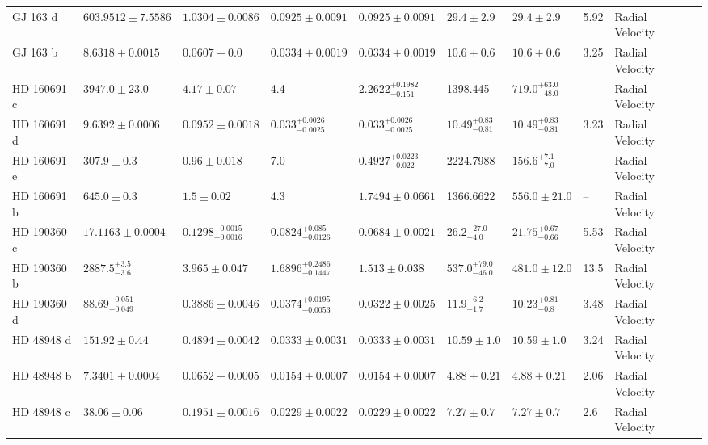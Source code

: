 \begin{tabular}{llllllllll}
GJ 163 d & $603.9512 \pm 7.5586$ & $1.0304 \pm 0.0086$ & $0.0925 \pm 0.0091$ & $0.0925 \pm 0.0091$ & $29.4 \pm 2.9$ & $29.4 \pm 2.9$ & 5.92 & Radial Velocity & \cite{BONFILS_ET_AL__2013} \\
GJ 163 b & $8.6318 \pm 0.0015$ & $0.0607 \pm 0.0$ & $0.0334 \pm 0.0019$ & $0.0334 \pm 0.0019$ & $10.6 \pm 0.6$ & $10.6 \pm 0.6$ & 3.25 & Radial Velocity & \cite{BONFILS_ET_AL__2013} \\
HD 160691 c & $3947.0 \pm 23.0$ & $4.17 \pm 0.07$ & 4.4 & $2.2622^{+0.1982}_{-0.151}$ & 1398.445 & $719.0^{+63.0}_{-48.0}$ & -- & Radial Velocity & \cite{BENEDICT_ET_AL__2022} \\
HD 160691 d & $9.6392 \pm 0.0006$ & $0.0952 \pm 0.0018$ & $0.033^{+0.0026}_{-0.0025}$ & $0.033^{+0.0026}_{-0.0025}$ & $10.49^{+0.83}_{-0.81}$ & $10.49^{+0.83}_{-0.81}$ & 3.23 & Radial Velocity & \cite{BENEDICT_ET_AL__2022} \\
HD 160691 e & $307.9 \pm 0.3$ & $0.96 \pm 0.018$ & 7.0 & $0.4927^{+0.0223}_{-0.022}$ & 2224.7988 & $156.6^{+7.1}_{-7.0}$ & -- & Radial Velocity & \cite{BENEDICT_ET_AL__2022} \\
HD 160691 b & $645.0 \pm 0.3$ & $1.5 \pm 0.02$ & 4.3 & $1.7494 \pm 0.0661$ & 1366.6622 & $556.0 \pm 21.0$ & -- & Radial Velocity & \cite{BENEDICT_ET_AL__2022} \\
HD 190360 c & $17.1163 \pm 0.0004$ & $0.1298^{+0.0015}_{-0.0016}$ & $0.0824^{+0.085}_{-0.0126}$ & $0.0684 \pm 0.0021$ & $26.2^{+27.0}_{-4.0}$ & $21.75^{+0.67}_{-0.66}$ & 5.53 & Radial Velocity & \cite{GIOVINAZZI_ET_AL_2026} \\
HD 190360 b & $2887.5^{+3.5}_{-3.6}$ & $3.965 \pm 0.047$ & $1.6896^{+0.2486}_{-0.1447}$ & $1.513 \pm 0.038$ & $537.0^{+79.0}_{-46.0}$ & $481.0 \pm 12.0$ & 13.5 & Radial Velocity & \cite{GIOVINAZZI_ET_AL_2026} \\
HD 190360 d & $88.69^{+0.051}_{-0.049}$ & $0.3886 \pm 0.0046$ & $0.0374^{+0.0195}_{-0.0053}$ & $0.0322 \pm 0.0025$ & $11.9^{+6.2}_{-1.7}$ & $10.23^{+0.81}_{-0.8}$ & 3.48 & Radial Velocity & \cite{GIOVINAZZI_ET_AL_2026} \\
HD 48948 d & $151.92 \pm 0.44$ & $0.4894 \pm 0.0042$ & $0.0333 \pm 0.0031$ & $0.0333 \pm 0.0031$ & $10.59 \pm 1.0$ & $10.59 \pm 1.0$ & 3.24 & Radial Velocity & \cite{DALAL_ET_AL__2024} \\
HD 48948 b & $7.3401 \pm 0.0004$ & $0.0652 \pm 0.0005$ & $0.0154 \pm 0.0007$ & $0.0154 \pm 0.0007$ & $4.88 \pm 0.21$ & $4.88 \pm 0.21$ & 2.06 & Radial Velocity & \cite{DALAL_ET_AL__2024} \\
HD 48948 c & $38.06 \pm 0.06$ & $0.1951 \pm 0.0016$ & $0.0229 \pm 0.0022$ & $0.0229 \pm 0.0022$ & $7.27 \pm 0.7$ & $7.27 \pm 0.7$ & 2.6 & Radial Velocity & \cite{DALAL_ET_AL__2024} \\

\end{tabular}
